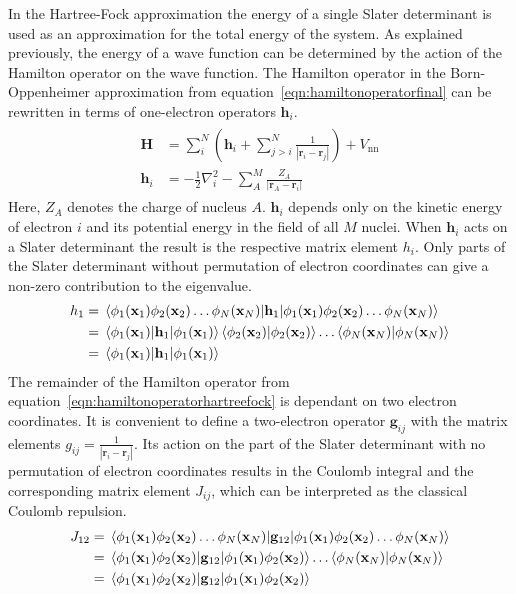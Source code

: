 In the Hartree-Fock approximation the energy of a single Slater determinant is
used as an approximation for the total energy of the system. As explained
previously, the energy of a wave function can be determined by the action of
the Hamilton operator on the wave function. The Hamilton operator in the
Born-Oppenheimer approximation from equation~\eqref{eqn:hamiltonoperatorfinal}
can be rewritten in terms of one-electron operators $\mathbf{h}_i$.
%
\begin{align}
\begin{aligned}
    \mathbf{H}&=\sum_i^N\left(\mathbf{h}_i + \sum_{j>i}^N\frac{1}{|\mathbf{r}_i-\mathbf{r}_j|}\right) + V_\text{nn} \\
    \mathbf{h}_i&=-\frac{1}{2}\nabla_i^2-\sum_A^M\frac{Z_A}{|\mathbf{r}_A-\mathbf{r}_i|}\label{eqn:hamiltonoperatorhartreefock}
\end{aligned}
\end{align}
%
Here, $Z_A$ denotes the charge of nucleus $A$. $\mathbf{h}_i$ depends only on
the kinetic energy of electron $i$ and its potential energy in the field of all
$M$ nuclei. When $\mathbf{h}_i$ acts on a Slater determinant the result is the
respective matrix element $h_i$. Only parts of the Slater determinant without
permutation of electron coordinates can give a non-zero contribution to the
eigenvalue.
%
\begin{align}
    \begin{aligned}
        h_1&=\mel{\phi_1(\mathbf{x}_1)\phi_2(\mathbf{x}_2)\ldots\phi_N(\mathbf{x}_N)}{\mathbf{h}_1}{\phi_1(\mathbf{x}_1)\phi_2(\mathbf{x}_2)\ldots\phi_N(\mathbf{x}_N)}\\
        &=\mel{\phi_1(\mathbf{x}_1)}{\mathbf{h}_1}{\phi_1(\mathbf{x}_1)}\braket{\phi_2(\mathbf{x}_2)}\ldots\braket{\phi_N(\mathbf{x}_N)} \\
        &=\mel{\phi_1(\mathbf{x}_1)}{\mathbf{h}_1}{\phi_1(\mathbf{x}_1)}
    \end{aligned}
\end{align}
%
The remainder of the Hamilton operator from
equation~\eqref{eqn:hamiltonoperatorhartreefock} is dependant on two electron
coordinates. It is convenient to define a two-electron operator $\mathbf{g}_{ij}$
with the matrix elements $g_{ij}=\frac{1}{|\mathbf{r}_i-\mathbf{r}_j|}$. Its
action on the part of the Slater determinant with no permutation of electron
coordinates results in the Coulomb integral and the corresponding matrix
element $J_{ij}$, which can be interpreted as the classical Coulomb repulsion.
%
\begin{align}
    \begin{aligned}
        J_{12}&=\mel{\phi_1(\mathbf{x}_1)\phi_2(\mathbf{x}_2)\ldots\phi_N(\mathbf{x}_N)}{\mathbf{g}_{12}}{\phi_1(\mathbf{x}_1)\phi_2(\mathbf{x}_2)\ldots\phi_N(\mathbf{x}_N)}\\
        &=\mel{\phi_1(\mathbf{x}_1)\phi_2(\mathbf{x}_2)}{\mathbf{g}_{12}}{\phi_1(\mathbf{x}_1)\phi_2(\mathbf{x}_2)}\ldots\braket{\phi_N(\mathbf{x}_N)} \\
        &=\mel{\phi_1(\mathbf{x}_1)\phi_2(\mathbf{x}_2)}{\mathbf{g}_{12}}{\phi_1(\mathbf{x}_1)\phi_2(\mathbf{x}_2)}
    \end{aligned}
\end{align}
